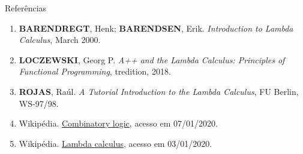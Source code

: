 \begin{frame}[fragile]{Referências}

    \begin{enumerate}
        \item \textbf{BARENDREGT}, Henk; \textbf{BARENDSEN}, Erik. \textit{Introduction to 
            Lambda Calculus}, March 2000.

        \item \textbf{LOCZEWSKI}, Georg P. \textit{A++ and the Lambda Calculus: Principles of
            Functional Programming}, tredition, 2018.

        \item \textbf{ROJAS}, Raúl. \textit{A Tutorial Introduction to the Lambda Calculus},
            FU Berlin, WS-97/98.

        \item Wikipédia. \href{https://en.wikipedia.org/wiki/Combinatory_logic}{Combinatory logic},
            acesso em 07/01/2020.

        \item Wikipédia. \href{https://en.wikipedia.org/wiki/Lambda_calculus}{Lambda calculus},
            acesso em 03/01/2020. 

    \end{enumerate}

\end{frame}
